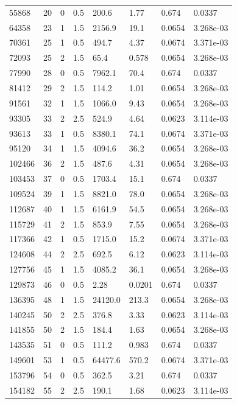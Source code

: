 \documentclass[preview]{standalone}
\begin{document}
{{\begin{tabular}{L{1.2cm}C{1.2cm} C{0.3cm}C{0.5cm} C{1.4cm}C{1.4cm} C{1.4cm}C{1.4cm}}
  55868  &    20  & 0     & 0.5 &  200.6  & 1.77  & 0.674 &  0.0337   \\ 
  64358  &    23  & 1     & 1.5 &  2156.9  & 19.1  & 0.0654 &  3.268e-03   \\ 
  70361  &    25  & 1     & 0.5 &  494.7  & 4.37  & 0.0674 &  3.371e-03   \\ 
  72093  &    25  & 2     & 1.5 &  65.4  & 0.578  & 0.0654 &  3.268e-03   \\ 
  77990  &    28  & 0     & 0.5 &  7962.1  & 70.4  & 0.674 &  0.0337   \\ 
  81412  &    29  & 2     & 1.5 &  114.2  & 1.01  & 0.0654 &  3.268e-03   \\ 
  91561  &    32  & 1     & 1.5 &  1066.0  & 9.43  & 0.0654 &  3.268e-03   \\ 
  93305  &    33  & 2     & 2.5 &  524.9  & 4.64  & 0.0623 &  3.114e-03   \\ 
  93613  &    33  & 1     & 0.5 &  8380.1  & 74.1  & 0.0674 &  3.371e-03   \\ 
  95120  &    34  & 1     & 1.5 &  4094.6  & 36.2  & 0.0654 &  3.268e-03   \\ 
  102466  &    36  & 2     & 1.5 &  487.6  & 4.31  & 0.0654 &  3.268e-03   \\ 
  103453  &    37  & 0     & 0.5 &  1703.4  & 15.1  & 0.674 &  0.0337   \\ 
  109524  &    39  & 1     & 1.5 &  8821.0  & 78.0  & 0.0654 &  3.268e-03   \\ 
  112687  &    40  & 1     & 1.5 &  6161.9  & 54.5  & 0.0654 &  3.268e-03   \\ 
  115729  &    41  & 2     & 1.5 &  853.9  & 7.55  & 0.0654 &  3.268e-03   \\ 
  117366  &    42  & 1     & 0.5 &  1715.0  & 15.2  & 0.0674 &  3.371e-03   \\ 
  124608  &    44  & 2     & 2.5 &  692.5  & 6.12  & 0.0623 &  3.114e-03   \\ 
  127756  &    45  & 1     & 1.5 &  4085.2  & 36.1  & 0.0654 &  3.268e-03   \\ 
  129873  &    46  & 0     & 0.5 &  2.28  & 0.0201  & 0.674 &  0.0337   \\ 
  136395  &    48  & 1     & 1.5 &  24120.0  & 213.3  & 0.0654 &  3.268e-03   \\ 
  140245  &    50  & 2     & 2.5 &  376.8  & 3.33  & 0.0623 &  3.114e-03   \\ 
  141855  &    50  & 2     & 1.5 &  184.4  & 1.63  & 0.0654 &  3.268e-03   \\ 
  143535  &    51  & 0     & 0.5 &  111.2  & 0.983  & 0.674 &  0.0337   \\ 
  149601  &    53  & 1     & 0.5 &  64477.6  & 570.2  & 0.0674 &  3.371e-03   \\ 
  153796  &    54  & 0     & 0.5 &  362.5  & 3.21  & 0.674 &  0.0337   \\ 
  154182  &    55  & 2     & 2.5 &  190.1  & 1.68  & 0.0623 &  3.114e-03   \\ 
\hline 
\end{tabular} 

}}
\end{document}
